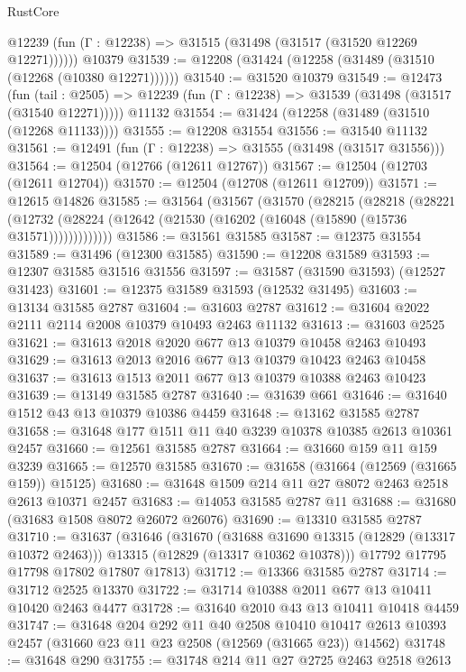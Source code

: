 \begin{lexlean}{RustCore}
\begin{coremodule}
      @12239 (fun (Γ : @12238) => @31515 (@31498 (@31517 (@31520 @12269 @12271))))))
    @10379
@31539 := @12208 (@31424 (@12258 (@31489 (@31510 (@12268 (@10380 @12271))))))
@31540 := @31520 @10379
@31549 := @12473
    (fun (tail : @2505) => @12239 (fun (Γ : @12238) => @31539 (@31498 (@31517 (@31540 @12271)))))
    @11132
@31554 := @31424 (@12258 (@31489 (@31510 (@12268 @11133))))
@31555 := @12208 @31554
@31556 := @31540 @11132
@31561 := @12491 (fun (Γ : @12238) => @31555 (@31498 (@31517 @31556)))
@31564 := @12504 (@12766 (@12611 @12767))
@31567 := @12504 (@12703 (@12611 @12704))
@31570 := @12504 (@12708 (@12611 @12709))
@31571 := @12615 @14826
@31585 := @31564
    (@31567
      (@31570
        (@28215
          (@28218
            (@28221
              (@12732 (@28224 (@12642 (@21530 (@16202 (@16048 (@15890 (@15736 @31571)))))))))))))
@31586 := @31561 @31585
@31587 := @12375 @31554
@31589 := @31496 (@12300 @31585)
@31590 := @12208 @31589
@31593 := @12307 @31585 @31516 @31556
@31597 := @31587 (@31590 @31593) (@12527 @31423)
@31601 := @12375 @31589 @31593 (@12532 @31495)
@31603 := @13134 @31585 @2787
@31604 := @31603 @2787
@31612 := @31604 @2022 @2111 @2114 @2008 @10379 @10493 @2463 @11132
@31613 := @31603 @2525
@31621 := @31613 @2018 @2020 @677 @13 @10379 @10458 @2463 @10493
@31629 := @31613 @2013 @2016 @677 @13 @10379 @10423 @2463 @10458
@31637 := @31613 @1513 @2011 @677 @13 @10379 @10388 @2463 @10423
@31639 := @13149 @31585 @2787
@31640 := @31639 @661
@31646 := @31640 @1512 @43 @13 @10379 @10386 @4459
@31648 := @13162 @31585 @2787
@31658 := @31648 @177 @1511 @11 @40 @3239 @10378 @10385 @2613 @10361 @2457
@31660 := @12561 @31585 @2787
@31664 := @31660 @159 @11 @159 @3239
@31665 := @12570 @31585
@31670 := @31658 (@31664 (@12569 (@31665 @159)) @15125)
@31680 := @31648 @1509 @214 @11 @27 @8072 @2463 @2518 @2613 @10371 @2457
@31683 := @14053 @31585 @2787 @11
@31688 := @31680 (@31683 @1508 @8072 @26072 @26076)
@31690 := @13310 @31585 @2787
@31710 := @31637
    (@31646
      (@31670
        (@31688 @31690 @13315 (@12829 (@13317 @10372 @2463)))
        @13315
        (@12829 (@13317 @10362 @10378)))
      @17792
      @17795
      @17798
      @17802
      @17807
      @17813)
@31712 := @13366 @31585 @2787
@31714 := @31712 @2525 @13370
@31722 := @31714 @10388 @2011 @677 @13 @10411 @10420 @2463 @4477
@31728 := @31640 @2010 @43 @13 @10411 @10418 @4459
@31747 := @31648
    @204
    @292
    @11
    @40
    @2508
    @10410
    @10417
    @2613
    @10393
    @2457
    (@31660 @23 @11 @23 @2508 (@12569 (@31665 @23)) @14562)
@31748 := @31648 @290
@31755 := @31748 @214 @11 @27 @2725 @2463 @2518 @2613

\end{coremodule}
\end{lexlean}
